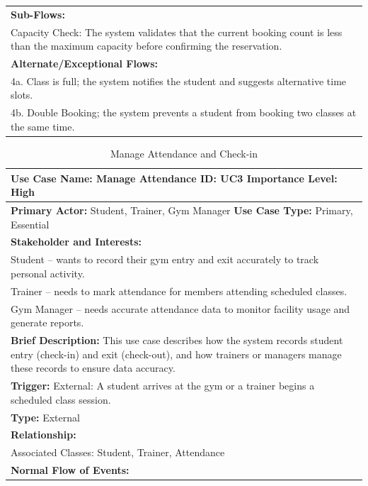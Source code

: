 \documentclass[12pt, a4paper]{article}
\begin{document}
\begin{table}[H]
\begin{tabularx}{\textwidth}{X}
        \textbf{Sub-Flows:} \\
        Capacity Check: The system validates that the current booking count is less than the maximum capacity before confirming the reservation. \\
        \textbf{Alternate/Exceptional Flows:} \\
        4a. Class is full; the system notifies the student and suggests alternative time slots. \\
        4b. Double Booking; the system prevents a student from booking two classes at the same time. \\
        \hline
    \end{tabularx}
\end{table}

\begin{table}[H]
    \centering
    \caption{Manage Attendance and Check-in}
    \renewcommand{\arraystretch}{1.3} %
    \small
    \begin{tabularx}{\textwidth}{X}
        \hline
        \textbf{Use Case Name:} Manage Attendance \hfill \textbf{ID:} UC3 \hfill \textbf{Importance Level:} High \\
        \hline
        \textbf{Primary Actor:} Student, Trainer, Gym Manager \hfill \textbf{Use Case Type:} Primary, Essential \\
        \textbf{Stakeholder and Interests:} \\
        Student -- wants to record their gym entry and exit accurately to track personal activity. \\
        Trainer -- needs to mark attendance for members attending scheduled classes. \\
        Gym Manager -- needs accurate attendance data to monitor facility usage and generate reports. \\
        \textbf{Brief Description:} This use case describes how the system records student entry (check-in) and exit (check-out), and how trainers or managers manage these records to ensure data accuracy. \\
        \textbf{Trigger:} External: A student arrives at the gym or a trainer begins a scheduled class session. \\
        \textbf{Type:} External \\
        \textbf{Relationship:} \\
        Associated Classes: Student, Trainer, Attendance  \\
        \textbf{Normal Flow of Events:}
    

\end{tabularx}
\end{table}
\end{document}

